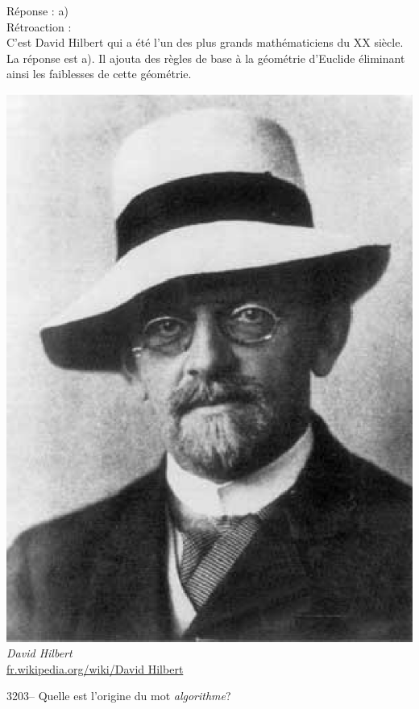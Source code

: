 \documentclass[letterpaper, 12pt]{article}
\begin{document}
R\'eponse : a)\\

R\'etroaction :\\
C'est David Hilbert qui a \'et\'e l'un des plus grands math\'ematiciens du {\scriptsize XX\ieme{}} si\`ecle. La r\'eponse est a). Il ajouta des r\`egles de base \`a la g\'eom\'etrie d'Euclide \'eliminant ainsi les faiblesses de cette g\'eom\'etrie.
\begin{center}
\includegraphics[scale=0.35]{Hilbert.eps}\\
\emph{{\small David Hilbert}}\\
\href{http://fr.wikipedia.org/wiki/David_Hilbert}{fr.wikipedia.org/wiki/David Hilbert}\\[5mm]
\end{center}



3203-- Quelle est l'origine du mot \emph{algorithme}?\\
\end{document}
